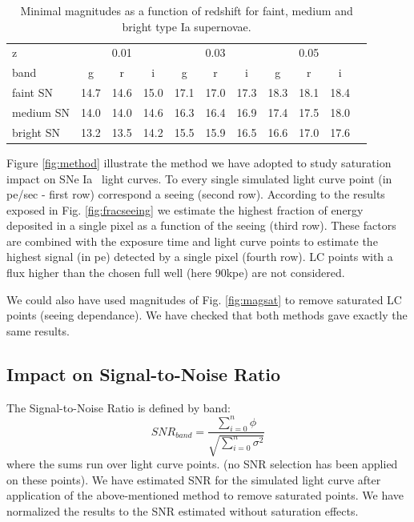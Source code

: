 \documentclass[\docopts]{\docclass}
\newcommand{\sne}{{SNe Ia }}
\begin{document}
\begin{table}[!htbp]
  \caption{Minimal magnitudes as a function of redshift for faint, medium and bright type Ia supernovae.}\label{tab:minimag}
  \begin{center}
    \begin{tabular}{l|ccc|ccc|cccc}
      \hline
      \hline
      z        &\multicolumn{3}{c}{0.01} & \multicolumn{3}{c}{0.03} & \multicolumn{3}{c}{0.05} \\
      band & g & r & i & g & r & i & g & r &i \\
      \hline
      \hline
      faint SN   & 14.7 & 14.6 & 15.0 & 17.1 & 17.0 & 17.3 & 18.3 & 18.1 & 18.4 \\
      medium SN  & 14.0 & 14.0 & 14.6 & 16.3 & 16.4 & 16.9 & 17.4 & 17.5 & 18.0 \\
      bright SN & 13.2 & 13.5 & 14.2 & 15.5 & 15.9 & 16.5 & 16.6 & 17.0 & 17.6\\
      \hline
    \end{tabular}
  \end{center}
  \end{table}

Figure \ref{fig:method} illustrate the method we have adopted to study saturation impact on \sne~light curves. To every single simulated light curve point (in pe/sec - first row) correspond a seeing (second row). According to the results exposed in Fig. \ref{fig:fracseeing} we estimate the highest fraction of energy deposited in a single pixel as a function of the seeing (third row). These factors are combined with the exposure time and  light curve points to estimate the highest signal (in pe) detected by a single pixel (fourth row). LC points with a flux higher than the chosen full well (here 90kpe) are not considered.\par
We could also have used  magnitudes of Fig. \ref{fig:magsat} to remove saturated LC points (seeing dependance). We have checked that both methods gave exactly the same results. 

\subsection{Impact on Signal-to-Noise Ratio}
The Signal-to-Noise Ratio is defined by band:
\begin{equation}
 SNR_{band} = \frac{\displaystyle \sum_{i=0}^{n}  \phi}{\sqrt{\displaystyle \sum_{i=0}^{n}  \sigma^2}}
\end{equation}
where the sums run over light curve points. (no SNR selection has been applied on these points). We have estimated SNR for the simulated light curve after application of the above-mentioned method to remove saturated points. We have normalized the results to the SNR estimated without saturation effects. 
\end{document}
